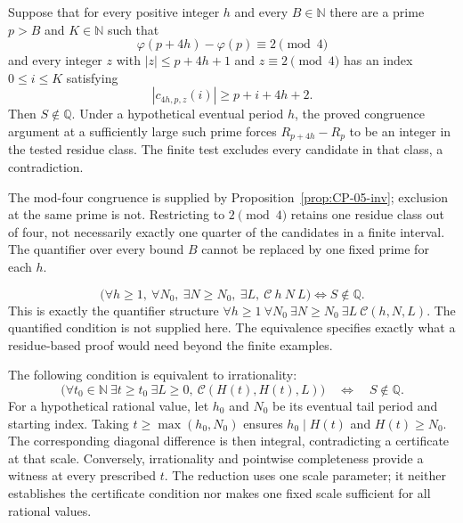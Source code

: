 \begin{prop}\label{prop:CP-07}
Suppose that for every positive integer $h$ and every $B\in\mathbb N$
there are a prime $p>B$ and $K\in\mathbb N$ such that
\[
 \varphi(p+4h)-\varphi(p)\equiv2\pmod4
\]
and every integer $z$ with $|z|\le p+4h+1$ and $z\equiv2\pmod4$
has an index $0\le i\le K$ satisfying
\[
 |c_{4h,p,z}(i)|\ge p+i+4h+2.
\]
Then $S\notin\mathbb Q$. Under a hypothetical eventual period $h$,
the proved congruence argument at a sufficiently large such prime
forces $R_{p+4h}-R_p$ to be an integer in the tested residue class.
The finite test excludes every candidate in that class, a contradiction.

The mod-four congruence is supplied by
Proposition~\ref{prop:CP-05-inv}; exclusion at the same prime is not.
Restricting to $2\pmod4$ retains one residue class out of four, not
necessarily exactly one quarter of the candidates in a finite interval.
The quantifier over every bound $B$ cannot be replaced by one fixed
prime for each $h$.

\end{prop}

\begin{prop}\label{prop:A10}
\[
\big(\forall h\ge 1,\ \forall N_0,\ \exists N\ge N_0,\ \exists L,\ \mathcal{C}\ h\ N\ L\big)
\iff S\notin\mathbb Q.
\]
This is exactly the quantifier structure $\forall h\ge1\ \forall N_0\ \exists N\ge N_0\ \exists L\ \mathcal{C}(h,N,L)$.
The quantified condition is not supplied here. The equivalence specifies
exactly what a residue-based proof would need beyond the finite examples.
\end{prop}

\begin{prop}\label{prop:B3}
The following condition is equivalent to irrationality:
\[
 \bigl(\forall t_0\in\mathbb N\ \exists t\ge t_0\ \exists L\ge0,
       \ \mathcal C(H(t),H(t),L)\bigr)
 \quad\Longleftrightarrow\quad S\notin\mathbb Q.
\]
For a hypothetical rational value, let $h_0$ and $N_0$ be its eventual
tail period and starting index. Taking $t\ge\max(h_0,N_0)$ ensures
$h_0\mid H(t)$ and $H(t)\ge N_0$. The corresponding diagonal difference
is then integral, contradicting a certificate at that scale.
Conversely, irrationality and pointwise completeness provide a witness
at every prescribed $t$. The reduction uses one scale parameter; it
neither establishes the certificate condition nor makes one fixed scale
sufficient for all rational values.
\end{prop}


